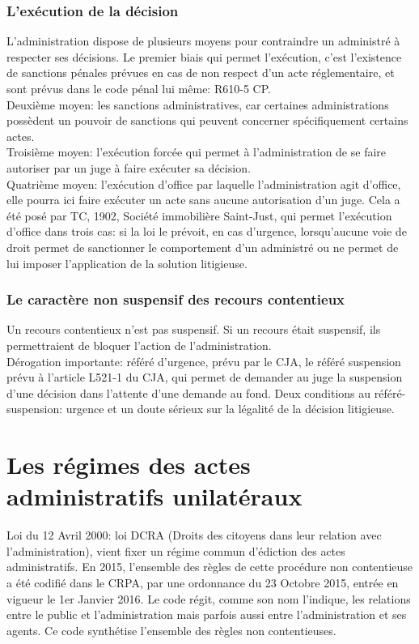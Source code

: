 \documentclass[10pt, a4paper, openany]{book}
\begin{document}
\subsection{L'exécution de la décision}

L'administration dispose de plusieurs moyens pour contraindre un administré à respecter ses décisions. Le premier biais qui permet l'exécution, c'est l'existence de sanctions pénales prévues en cas de non respect d'un acte réglementaire, et sont prévus dans le code pénal lui même: R610-5 CP. \\
Deuxième moyen: les sanctions administratives, car certaines administrations possèdent un pouvoir de sanctions qui peuvent concerner spécifiquement certains actes. \\
Troisième moyen: l'exécution forcée qui permet à l'administration de se faire autoriser par un juge à faire exécuter sa décision. \\
Quatrième moyen: l'exécution d'office par laquelle l'administration agit d'office, elle pourra ici faire exécuter un acte sans aucune autorisation d'un juge. Cela a été posé par TC, 1902, Société immobilière Saint-Just, qui permet l'exécution d'office dans trois cas: si la loi le prévoit, en cas d'urgence, lorsqu'aucune voie de droit permet de sanctionner le comportement d'un administré ou ne permet de lui imposer l'application de la solution litigieuse. 

\subsection{Le caractère non suspensif des recours contentieux}

Un recours contentieux n'est pas suspensif. Si un recours était suspensif, ils permettraient de bloquer l'action de l'administration. \\
Dérogation importante: référé d'urgence, prévu par le CJA, le référé suspension prévu à l'article L521-1 du CJA, qui permet de demander au juge la suspension d'une décision dans l'attente d'une demande au fond. Deux conditions au référé-suspension: urgence et un doute sérieux sur la légalité de la décision litigieuse. 

\chapter{Les régimes des actes administratifs unilatéraux}

Loi du 12 Avril 2000: loi DCRA (Droits des citoyens dans leur relation avec l'administration), vient fixer un régime commun d'édiction des actes administratifs. En 2015, l'ensemble des règles de cette procédure non contentieuse a été codifié dans le CRPA, par une ordonnance du 23 Octobre 2015, entrée en vigueur le 1er Janvier 2016. Le code régit, comme son nom l'indique, les relations entre le public et l'administration mais parfois aussi entre l'administration et ses agents. Ce code synthétise l'ensemble des règles non contentieuses. 
\end{document}
